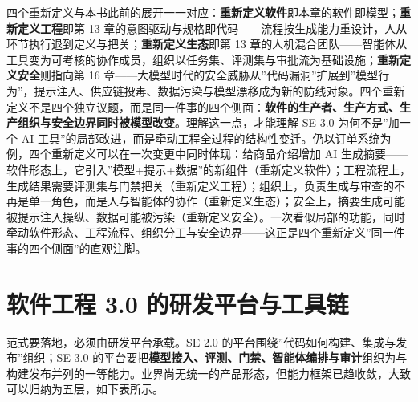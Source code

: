 \documentclass[
]{ctexbook}
\begin{document}
四个重新定义与本书此前的展开一一对应：\textbf{重新定义软件}即本章的软件即模型；\textbf{重新定义工程}即第
13
章的意图驱动与规格即代码------流程按生成能力重设计，人从环节执行退到定义与把关；\textbf{重新定义生态}即第
13
章的人机混合团队------智能体从工具变为可考核的协作成员，组织以任务集、评测集与审批流为基础设施；\textbf{重新定义安全}则指向第
16
章------大模型时代的安全威胁从''代码漏洞''扩展到''模型行为''，提示注入、供应链投毒、数据污染与模型漂移成为新的防线对象。四个重新定义不是四个独立议题，而是同一件事的四个侧面：\textbf{软件的生产者、生产方式、生产组织与安全边界同时被模型改变}。理解这一点，才能理解
SE 3.0 为何不是''加一个 AI
工具''的局部改进，而是牵动工程全过程的结构性变迁。仍以订单系统为例，四个重新定义可以在一次变更中同时体现：给商品介绍增加
AI
生成摘要------软件形态上，它引入''模型+提示+数据''的新组件（重新定义软件）；工程流程上，生成结果需要评测集与门禁把关（重新定义工程）；组织上，负责生成与审查的不再是单一角色，而是人与智能体的协作（重新定义生态）；安全上，摘要生成可能被提示注入操纵、数据可能被污染（重新定义安全）。一次看似局部的功能，同时牵动软件形态、工程流程、组织分工与安全边界------这正是四个重新定义''同一件事的四个侧面''的直观注脚。

\section{软件工程 3.0
的研发平台与工具链}\label{ux8f6fux4ef6ux5de5ux7a0b-3.0-ux7684ux7814ux53d1ux5e73ux53f0ux4e0eux5de5ux5177ux94fe}

范式要落地，必须由研发平台承载。SE 2.0
的平台围绕''代码如何构建、集成与发布''组织；SE 3.0
的平台要把\textbf{模型接入、评测、门禁、智能体编排与审计}组织为与构建发布并列的一等能力。业界尚无统一的产品形态，但能力框架已趋收敛，大致可以归纳为五层，如下表所示。
\end{document}
